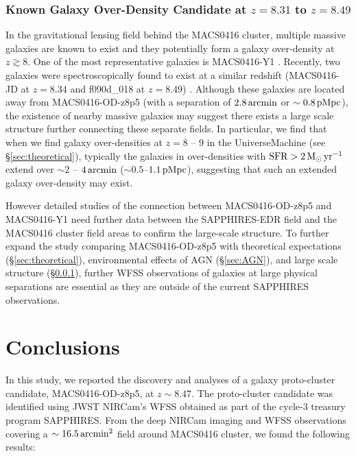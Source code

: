\documentclass[twocolumn]{aastex631}
\begin{document}
\subsubsection{Known Galaxy Over-Density Candidate at $z=8.31$ to $z=8.49$ }
\label{sec:lss}
In the gravitational lensing field behind the MACS0416 cluster, multiple massive galaxies are known to exist and they potentially form a galaxy over-density at $z\gtrsim8$. One of the most representative galaxies is MACS0416-Y1 \citep{Bakx2020,Tamura2019,Tamura2023}. Recently, two galaxies were spectroscopically found to exist at a similar redshift (MACS0416-JD at $z=8.34$ and f090d\_018 at $z=8.49$) \citep{Li2023, Ma2024}. Although these galaxies are located away from MACS0416-OD-z8p5 (with a separation of $2.8\,{\rm arcmin}$ or $\sim0.8\,{\rm pMpc}$), the existence of nearby massive galaxies may suggest there exists a large scale structure further connecting these separate fields.
In particular, we find that when we find galaxy over-densities at $z=8$ -- $9$ in the UniverseMachine (see \S\ref{sec:theoretical}), typically the galaxies in over-densities with ${\rm SFR>2\,{\rm M_{\odot}\,yr^{-1}}}$ extend over $\sim2$ -- $4\,{\rm arcmin}$ ($\sim0.5$--$1.1\,{\rm pMpc}$), suggesting that such an extended galaxy over-density may exist.

However detailed studies of the connection between MACS0416-OD-z8p5 and MACS0416-Y1 need further data between the SAPPHIRES-EDR field and the MACS0416 cluster field areas to confirm the large-scale structure.
To further expand the study comparing MACS0416-OD-z8p5 with theoretical expectations (\S\ref{sec:theoretical}), environmental effects of AGN (\S\ref{sec:AGN}), and large scale structure (\S\ref{sec:lss}), further WFSS observations of galaxies at large physical separations are essential as they are outside of the current SAPPHIRES observations.

\section{Conclusions} \label{sec:conclusion}

In this study, we reported the discovery and analyses of a galaxy proto-cluster candidate, MACS0416-OD-z8p5, at $z\sim8.47$. The proto-cluster candidate was identified using JWST NIRCam's WFSS obtained as part of the cycle-3 treasury program SAPPHIRES. From the deep NIRCam imaging and WFSS observations covering a $\sim16.5\,{\rm arcmin^2}$ field around MACS0416 cluster, we found the following results:
\vspace{0.2cm}
\end{document}
